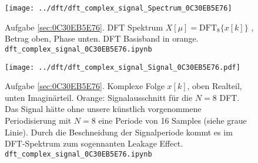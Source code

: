\begin{figure}
\centering
\texttt{[image: ../dft/dft\_complex\_signal\_Spectrum\_0C30EB5E76]}
\caption{Aufgabe \ref{sec:0C30EB5E76}. DFT Spektrum $X[\mu]=\mathrm{DFT}_8\{x[k]\}$ ,
Betrag oben, Phase unten. DFT Basisband in orange.
\texttt{dft\_complex\_signal\_0C30EB5E76.ipynb}}
\label{fig:dft_complex_signal_Spectrum_0C30EB5E76}
\end{figure}
%
\begin{figure}
\centering
\texttt{[image: ../dft/dft\_complex\_signal\_Signal\_0C30EB5E76.pdf]}
\caption{Aufgabe \ref{sec:0C30EB5E76}. Komplexe Folge $x[k]$, oben Realteil,
unten Imaginärteil. Orange: Signalausschnitt für die $N=8$ DFT. Das Signal
hätte ohne unsere künstlich vorgenommene Periodisierung mit $N=8$
eine Periode von 16 Samples (siehe graue Linie). Durch die Beschneidung der
Signalperiode kommt es im DFT-Spektrum
 zum sogennanten Leakage Effect.
\texttt{dft\_complex\_signal\_0C30EB5E76.ipynb}}
\label{fig:dft_complex_signal_Signal_0C30EB5E76}
\end{figure}







\clearpage
